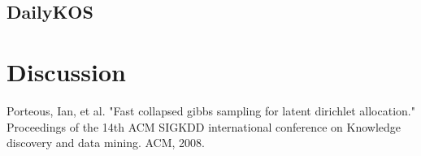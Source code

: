 \documentclass[twoside,12pt]{article}
\begin{document}
\subsection{DailyKOS}

\section{Discussion}


\begin{thebibliography}{9}
Porteous, Ian, et al. "Fast collapsed gibbs sampling for latent dirichlet allocation." Proceedings of the 14th ACM SIGKDD international conference on Knowledge discovery and data mining. ACM, 2008.

\end{thebibliography}
\end{document}
